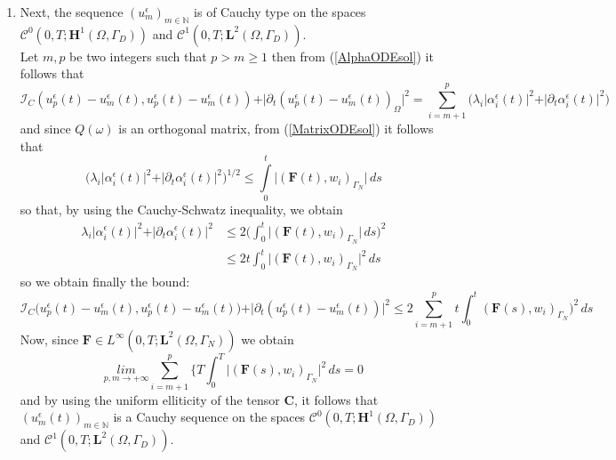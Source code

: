 \begin{enumerate}
    \item Next, the sequence $(u^{\epsilon}_m)_{m \in \mathbb{N}}$ is of Cauchy type on the spaces $\mathcal{C}^0(0,T;\mathbf{H}^1(\Omega, \Gamma_D))$ and $\mathcal{C}^1(0,T; \mathbf{L}^2(\Omega,\Gamma_D))$.\\
    Let $m,p$ be two integers such that $p > m \geq 1$ then from (\ref{AlphaODEsol}) it follows that
    \begin{equation*}
        \mathcal{I}_C(u_p^{\epsilon}(t)- u_m^{\epsilon}(t),u_p^{\epsilon}(t)- u_m^{\epsilon}(t)) + \vert \partial_t (u_p^{\epsilon}(t)- u_m^{\epsilon}(t))_{\Omega} \vert^2 = \sum_{i=m+1}^p \big( \lambda_i \vert \alpha_i^{\epsilon}(t) \vert^2 + \vert \partial_t \alpha_i^{\epsilon}(t) \vert^2 \big) 
    \end{equation*}
    and since $Q(\omega)$ is an orthogonal matrix, from (\ref{MatrixODEsol}) it follows that
    \begin{equation}
        \label{AlphaBound}
        \big( \lambda_i \vert \alpha_i^{\epsilon}(t) \vert^2 + \vert \partial_t \alpha_i^{\epsilon}(t) \vert^2 \big)^{1/2} \leq \int \limits_0^t \vert (\mathbf{F}(t),w_i)_{\Gamma_N} \vert \, ds 
    \end{equation}
    so that, by using the Cauchy-Schwatz inequality, we obtain
    \begin{align*}
        \lambda_i \vert \alpha_i^{\epsilon}(t) \vert^2 + \vert \partial_t \alpha_i^{\epsilon}(t) \vert^2 &\leq 2 \big( \int_0^t \vert (\mathbf{F}(t),w_i)_{\Gamma_N} \vert \, ds \big)^2 \\
        & \leq  2 t \int_0^t \vert (\mathbf{F}(t),w_i)_{\Gamma_N} \vert^2 \, ds
    \end{align*}
    so we obtain finally the bound:
    \begin{equation*}
        \mathcal{I}_C \big(u_p^{\epsilon}(t) - u_m^{\epsilon}(t),u_p^{\epsilon}(t) - u_m^{\epsilon}(t) \big) + \vert \partial_t (u_p^{\epsilon}(t) - u_m^{\epsilon}(t)) \vert^2 \leq 2 \sum_{i=m+1}^p t \int_0^t (\mathbf{F}(s),w_i)_{\Gamma_N})^2 \, ds
    \end{equation*}
    Now, since $\mathbf{F} \in L^{\infty}(0,T;\mathbf{L}^2(\Omega, \Gamma_N))$ we obtain
    \begin{equation*}
        \underset{p,m \longrightarrow + \infty}{lim} \sum_{i=m+1}^p \big \{ T \int_0^T \vert (\mathbf{F}(s),w_i)_{\Gamma_N}\vert^2 \, ds = 0
    \end{equation*}
    and by using the uniform elliticity of the tensor $\mathbf{C}$, it follows that $(u_m^{\epsilon}(t))_{m \in \mathbb{N}}$ is a Cauchy sequence on the spaces $\mathcal{C}^0(0,T; \mathbf{H}^1(\Omega, \Gamma_D))$ and $\mathcal{C}^1(0,T; \mathbf{L}^2(\Omega, \Gamma_D))$.

\end{enumerate}
